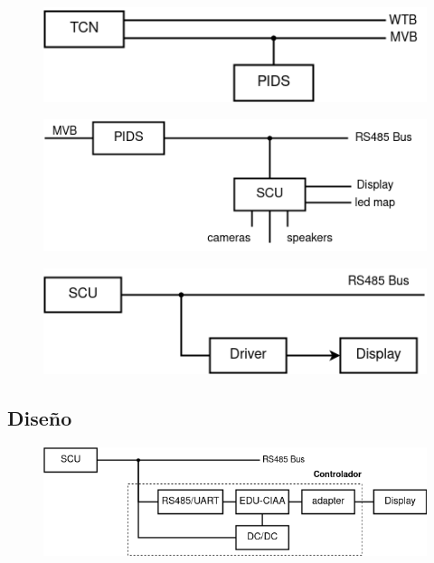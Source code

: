 \begin{figure}[ht]
	\centering
	\includegraphics[width=1\textwidth]{./Figures/diagTcnPidsBusesWtbMvb.png}
	\caption{}
	\label{fig:diagTcnPidsBuusesWtbMvb}
\end{figure}


\begin{figure}[ht]
	\centering
	\includegraphics[width=1\textwidth]{./Figures/diagPidsScuDevices.png}
	\caption{}
	\label{fig:diagPidsScuDevices}
\end{figure}

\begin{figure}[ht]
	\centering
	\includegraphics[width=1\textwidth]{./Figures/diagScuDriverDisplay.png}
	\caption{}
	\label{fig:diagScuDriverDisplay}
\end{figure}

\pagebreak
\subsection{Diseño}

\begin{figure}[ht]
	\centering
	\includegraphics[width=1\textwidth]{./Figures/diagVistaReDisenhoEduCIAA.png}
	\caption{}
	\label{fig:diagVistaReDisenhoEduCIAA}
\end{figure}


